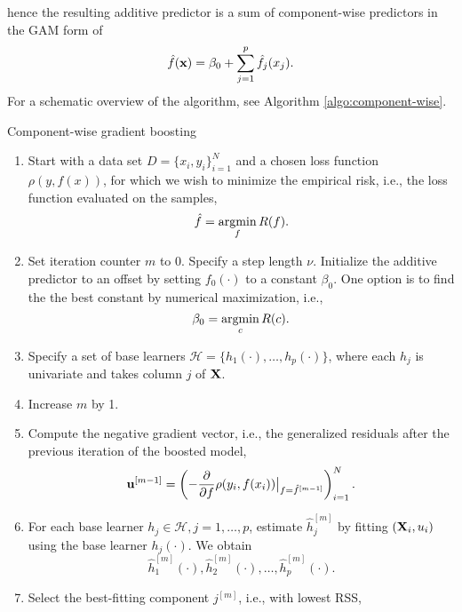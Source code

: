 hence the resulting additive predictor is a sum of component-wise predictors in the GAM form of
\begin{equation}
    \hat{f}(\mathbf{x})=\beta_0+\sum_{j=1}^p \hat{f}_j(x_j).
\end{equation}
For a schematic overview of the algorithm, see Algorithm \ref{algo:component-wise}.
\begin{algorithm}
\caption{Component-wise gradient boosting}\label{algo:component-wise}
\begin{enumerate}
    \item Start with a data set $D=\{x_i, y_i\}_{i=1}^N$ and a chosen loss function $\rho(y,f(x))$, for which we wish to
        minimize the empirical risk, i.e., the loss function evaluated on the samples,
        \begin{equation}
            \hat{f}=\operatorname*{argmin}_{f}R(f).
        \end{equation}
    \item Set iteration counter $m$ to 0. Specify a step length $\nu$. Initialize the additive predictor to an offset by setting $f_0(\cdot)$ to a constant $\beta_0$. One option is to find the the best constant by numerical maximization, i.e.,
        \begin{equation}
            \beta_0=\operatorname*{argmin}_c R(c).
        \end{equation}
    \item Specify a set of base learners $\mathcal{H}=\{h_1(\cdot),\dotsc,h_p(\cdot)\}$, where each $h_j$ is univariate and takes column $j$ of $\mathbf{X}$.
    \item\label{first-step} Increase $m$ by 1.
    \item Compute the negative gradient vector, i.e., the generalized residuals after the previous iteration of the boosted model,
        \begin{equation}
            \mathbf{u}^{[m-1]}=\left(-\frac{\partial}{\partial f}\rho(y_i, f(x_i))\big\rvert_{f=\hat{f}^{[m-1]}}\right)_{i=1}^N.
        \end{equation}
    \item For each base learner $h_j\in\mathcal{H},j=1,\ldots,p$, estimate $\hat{h}_{j}^{[m]}$ by fitting $(\mathbf{X}_i,u_i)$ using the base learner $h_j(\cdot)$. We obtain
        \begin{equation}
            \hat{h}_1^{[m]}(\cdot),\hat{h}_2^{[m]}(\cdot),\ldots,\hat{h}_p^{[m]}(\cdot).
        \end{equation}
    \item Select the best-fitting component $j^{[m]}$, i.e., with lowest RSS,

\end{enumerate}
\end{algorithm}
